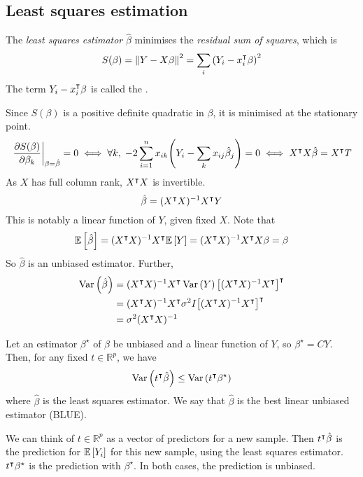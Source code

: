 \subsection{Least squares estimation}
\begin{definition}
	The \textit{least squares estimator} \( \hat \beta \) minimises the \textit{residual sum of squares}, which is
	\[ S(\beta) = \norm{Y-X\beta}^2 = \sum_i \qty(Y_i - x_i^\intercal \beta)^2 \]
	The term \( Y_i - x_i^\intercal \beta \) is called the .
\end{definition}
Since \( S(\beta) \) is a positive definite quadratic in \( \beta \), it is minimised at the stationary point.
\[ \eval{\pdv{S(\beta)}{\beta_k}}_{\beta = \hat \beta} = 0 \iff \forall k,\;-2\sum_{i=1}^n x_{ik} \qty(Y_i - \sum_k x_{ij} \hat \beta_j) = 0 \iff X^\transpose X \hat \beta = X^\transpose T \]
As \( X \) has full column rank, \( X^\intercal X \) is invertible.
\[ \hat \beta = (X^\intercal X)^{-1} X^\intercal Y \]
This is notably a linear function of \( Y \), given fixed \( X \).
Note that
\[ \mathbb{E}\left[{\hat \beta}\right] = (X^\intercal X)^{-1} X^\intercal \mathbb{E}\left[{Y}\right] = (X^\intercal X)^{-1} X^\intercal X\beta = \beta \]
So \( \hat \beta \) is an unbiased estimator.
Further,
\begin{align*}
	\operatorname{Var}\left({\hat \beta}\right) &= (X^\intercal X)^{-1} X^\intercal \operatorname{Var}\left({Y}\right) \qty[(X^\intercal X)^{-1} X^\intercal]^\intercal \\
	&= (X^\intercal X)^{-1} X^\intercal \sigma^2 I \qty[(X^\intercal X)^{-1} X^\intercal]^\intercal \\
	&= \sigma^2 (X^\intercal X)^{-1}
\end{align*}
\begin{theorem}
	Let an estimator \( \beta^\star \) of \( \beta \) be unbiased and a linear function of \( Y \), so \( \beta^\star = CY \).
	Then, for any fixed \( t \in \mathbb R^p \), we have
	\[ \operatorname{Var}\left({t^\intercal \hat \beta}\right) \leq \operatorname{Var}\left({t^\intercal \beta^\star}\right) \]
	where \( \hat \beta \) is the least squares estimator.
	We say that \( \hat \beta \) is the best linear unbiased estimator (BLUE).
\end{theorem}
\begin{remark}
	We can think of \( t \in \mathbb R^p \) as a vector of predictors for a new sample.
	Then \( t^\intercal \hat \beta \) is the prediction for \( \mathbb{E}\left[{Y_i}\right] \) for this new sample, using the least squares estimator.
	\( t^\intercal \beta^\star \) is the prediction with \( \beta^\star \).
	In both cases, the prediction is unbiased.
\end{remark}
